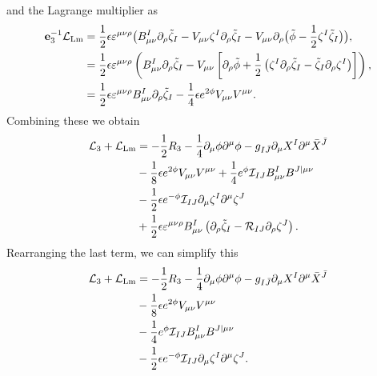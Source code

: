 and the Lagrange multiplier as
\begin{equation*}
\begin{aligned}
	\mathbf{e}_3^{-1} {\cal L}_{\text{Lm}} &= \frac{1}{2} \epsilon \varepsilon^{\mu\nu\rho} \big(B^I_{\mu \nu} \partial_\rho\tilde{\zeta}_I - V_{\mu \nu} \zeta^I \partial_\rho\tilde{\zeta}_I - V_{\mu\nu} \partial_\rho \big(\tilde{\phi} - \frac{1}{2} \zeta^I\tilde{\zeta}_I \big)\big) ,\\
	&= \frac{1}{2} \epsilon \varepsilon^{\mu\nu\rho} \left(B^I_{\mu \nu} \partial_\rho \tilde{\zeta}_I - V_{\mu \nu} \left[ \partial_\rho \tilde{\phi} + \frac{1}{2} \left( \zeta^I \partial_\rho \tilde{\zeta}_I - \tilde{\zeta}_I \partial_\rho \zeta^I \right)\right] \right) ,\\
	&= \frac{1}{2} \epsilon \varepsilon^{\mu\nu\rho} B^I_{\mu \nu} \partial_\rho \tilde{\zeta}_I - \frac{1}{4} \epsilon e^{2\phi} V_{\mu \nu} V^{\mu \nu}.
\end{aligned}
\end{equation*}
Combining these we obtain
\begin{equation*}
\begin{aligned}
 {\cal L}_3 + {\cal L}_{\text{Lm}} &= -\frac{1}{2} R_3 - \frac{1}{4}\partial_\mu \phi \partial^\mu \phi - g_{I\bar{J}} \partial_\mu X^I \partial^\mu \bar{X}^{\bar{J}} \\
 &- \frac{1}{8}\epsilon e^{2\phi}V_{\mu\nu} V^{\mu\nu} + \frac{1}{4}e^\phi {\cal I}_{IJ} B^I_{\mu \nu} B^{J |\mu \nu} \\
 &- \frac{1}{2}\epsilon e^{-\phi} {\cal I}_{IJ} \partial_\mu\zeta^I \partial^\mu \zeta^J \\
 &+ \frac{1}{2} \epsilon \varepsilon^{\mu\nu\rho} B^I_{\mu \nu} \left( \partial_\rho \tilde{\zeta}_I - {\cal R}_{IJ} \partial_\rho \zeta^J \right).
\end{aligned}
\end{equation*}
Rearranging the last term, we can simplify this
\begin{equation*}
\begin{aligned}
 {\cal L}_3 + {\cal L}_{\text{Lm}} &= -\frac{1}{2} R_3 - \frac{1}{4}\partial_\mu \phi \partial^\mu \phi - g_{I\bar{J}} \partial_\mu X^I \partial^\mu \bar{X}^{\bar{J}} \\
 &- \frac{1}{8}\epsilon e^{2\phi}V_{\mu\nu} V^{\mu\nu} \\
 &- \frac{1}{4}e^\phi {\cal I}_{IJ} B^I_{\mu \nu} B^{J |\mu \nu} \\
 &- \frac{1}{2}\epsilon e^{-\phi} {\cal I}_{IJ} \partial_\mu\zeta^I \partial^\mu \zeta^J .\\
\end{aligned}
\end{equation*}
